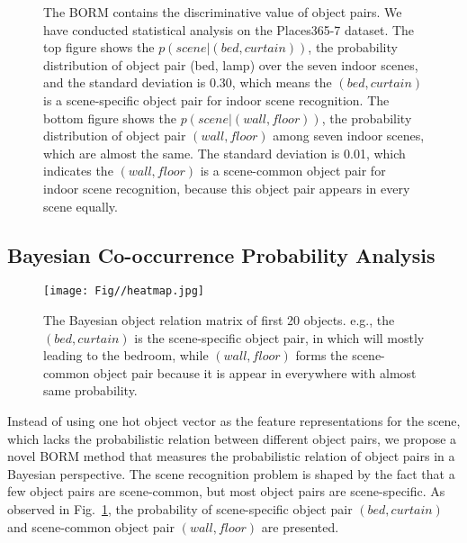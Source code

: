 \documentclass[letterpaper, 10 pt, conference]{ieeeconf}  %
\begin{document}
\begin{figure}[t]
	\centering
	\caption{The BORM contains the discriminative value of object pairs. We have conducted statistical analysis on the Places365-7 dataset. The top figure shows the $p(scene|(bed, curtain))$, the probability distribution of object pair (bed, lamp) over the seven indoor scenes, and the standard deviation is 0.30, which means the $(bed, curtain)$ is a scene-specific object pair for indoor scene recognition. The bottom figure shows the $p(scene|(wall, floor))$, the probability distribution of object pair $(wall, floor)$ among seven indoor scenes,  which are almost the same. The standard deviation is 0.01, which indicates the $(wall, floor)$ is a scene-common object pair for indoor scene recognition, because this object pair appears in every scene equally.}
	\label{fig:object_pair}
\end{figure}



\subsection{Bayesian Co-occurrence Probability Analysis}
\label{sec:BORM}

\begin{figure}[htbp]
	\centering
	\texttt{[image: Fig//heatmap.jpg]}
	\caption{The Bayesian object relation matrix of first 20 objects. e.g., the  $(bed,curtain)$ is the scene-specific object pair, in which will mostly leading to the bedroom, while $(wall,floor)$ forms the scene-common object pair because it is appear in everywhere with almost same probability.}
	\label{fig:BORM}
\end{figure}

Instead of using one hot object vector as the feature representations for the scene, which lacks the probabilistic relation between different object pairs, we propose a novel BORM method that measures the probabilistic relation of object pairs in a Bayesian perspective.
The scene recognition problem is shaped by the fact that a few object pairs are scene-common, but most object pairs are scene-specific. As observed in Fig.~\ref{fig:object_pair}, the probability of scene-specific object pair $(bed, curtain)$ and scene-common object pair $(wall, floor)$ are presented.
\end{document}
